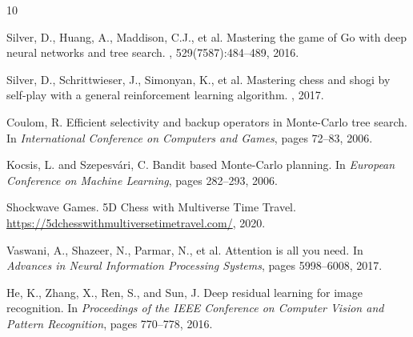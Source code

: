 \documentclass{article}
\begin{document}

\begin{thebibliography}{10}

Silver, D., Huang, A., Maddison, C.J., et al.
\newblock Mastering the game of Go with deep neural networks and tree search.
, 529(7587):484--489, 2016.

Silver, D., Schrittwieser, J., Simonyan, K., et al.
\newblock Mastering chess and shogi by self-play with a general reinforcement learning algorithm.
, 2017.

Coulom, R.
\newblock Efficient selectivity and backup operators in Monte-Carlo tree search.
\newblock In {\em International Conference on Computers and Games}, pages 72--83, 2006.

Kocsis, L. and Szepesvári, C.
\newblock Bandit based Monte-Carlo planning.
\newblock In {\em European Conference on Machine Learning}, pages 282--293, 2006.

Shockwave Games.
\newblock 5D Chess with Multiverse Time Travel.
\newblock \url{https://5dchesswithmultiversetimetravel.com/}, 2020.

Vaswani, A., Shazeer, N., Parmar, N., et al.
\newblock Attention is all you need.
\newblock In {\em Advances in Neural Information Processing Systems}, pages 5998--6008, 2017.

He, K., Zhang, X., Ren, S., and Sun, J.
\newblock Deep residual learning for image recognition.
\newblock In {\em Proceedings of the IEEE Conference on Computer Vision and Pattern Recognition}, pages 770--778, 2016.

\end{thebibliography}
\end{document}

